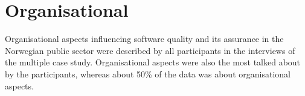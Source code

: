 





\section{Organisational} \label{sec:organisational}
Organisational aspects influencing software quality and its assurance in the Norwegian public sector were described by all participants in the interviews of the multiple case study. Organisational aspects were also the most talked about by the participants, whereas about 50\% of the data was about organisational aspects. 

